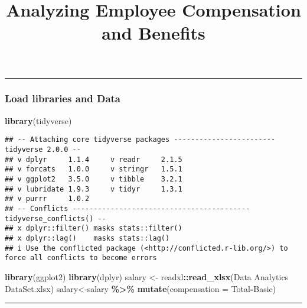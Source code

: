 \documentclass[
]{article}
\title{Analyzing Employee Compensation and Benefits}
\author{}
\date{\vspace{-2.5em}}
\newenvironment{Shaded}{\begin{snugshade}}{\end{snugshade}}
\newcommand{\AttributeTok}[1]{\textcolor[rgb]{0.13,0.29,0.53}{#1}}
\newcommand{\FunctionTok}[1]{\textcolor[rgb]{0.13,0.29,0.53}{\textbf{#1}}}
\newcommand{\NormalTok}[1]{#1}
\newcommand{\OtherTok}[1]{\textcolor[rgb]{0.56,0.35,0.01}{#1}}
\newcommand{\SpecialCharTok}[1]{\textcolor[rgb]{0.81,0.36,0.00}{\textbf{#1}}}
\newcommand{\StringTok}[1]{\textcolor[rgb]{0.31,0.60,0.02}{#1}}
\begin{document}
\maketitle

\begin{center}\rule{0.5\linewidth}{0.5pt}\end{center}

\subsubsection{Load libraries and Data}\label{load-libraries-and-data}

\begin{Shaded}
\begin{Highlighting}[]
\FunctionTok{library}\NormalTok{(tidyverse)}
\end{Highlighting}
\end{Shaded}

\begin{verbatim}
## -- Attaching core tidyverse packages ------------------------ tidyverse 2.0.0 --
## v dplyr     1.1.4     v readr     2.1.5
## v forcats   1.0.0     v stringr   1.5.1
## v ggplot2   3.5.0     v tibble    3.2.1
## v lubridate 1.9.3     v tidyr     1.3.1
## v purrr     1.0.2     
## -- Conflicts ------------------------------------------ tidyverse_conflicts() --
## x dplyr::filter() masks stats::filter()
## x dplyr::lag()    masks stats::lag()
## i Use the conflicted package (<http://conflicted.r-lib.org/>) to force all conflicts to become errors
\end{verbatim}

\begin{Shaded}
\begin{Highlighting}[]
\FunctionTok{library}\NormalTok{(ggplot2)}
\FunctionTok{library}\NormalTok{(dplyr)}
\NormalTok{salary }\OtherTok{\textless{}{-}}\NormalTok{ readxl}\SpecialCharTok{::}\FunctionTok{read\_xlsx}\NormalTok{(}\StringTok{\textquotesingle{}Data Analytics DataSet.xlsx\textquotesingle{}}\NormalTok{)}
\NormalTok{salary}\OtherTok{\textless{}{-}}\NormalTok{salary }\SpecialCharTok{\%\textgreater{}\%} \FunctionTok{mutate}\NormalTok{(}\AttributeTok{compensation =}\NormalTok{ Total}\SpecialCharTok{{-}}\NormalTok{Basic)}
\end{Highlighting}
\end{Shaded}

\begin{center}\rule{0.5\linewidth}{0.5pt}\end{center}
\end{document}
